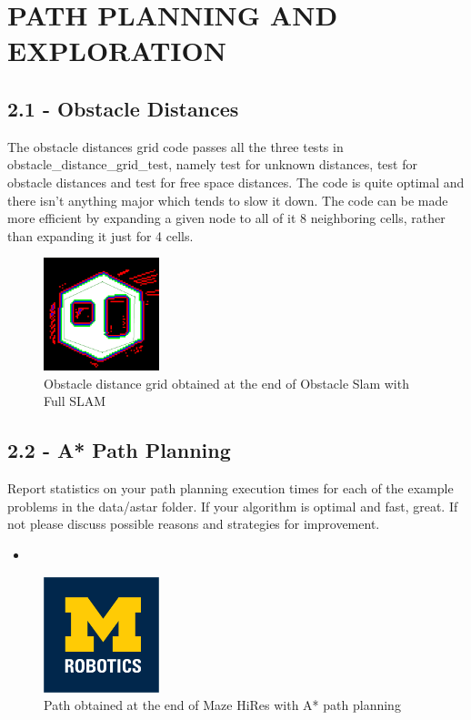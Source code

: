 \documentclass[journal,twocolumn]{IEEEtran}
\begin{document}
\section{PATH PLANNING AND EXPLORATION}

\subsection*{2.1 - Obstacle Distances} 

The obstacle distances grid code passes all the three tests in obstacle\_distance\_grid\_test, namely test for unknown distances, test for obstacle distances and test for free space distances. The code is quite optimal and there isn't anything major which tends to slow it down. The code can be made more efficient by expanding a given node to all of it 8 neighboring cells, rather than expanding it just for 4 cells.

\begin{figure}[H]
\centering
\includegraphics[width=0.3\textwidth]{Media/21.png}
\caption{Obstacle distance grid obtained at the end of Obstacle Slam with Full SLAM}
\end{figure}


\subsection*{2.2 - A* Path Planning} 

Report statistics on your path planning execution times for each of the example problems in the data/astar folder. If your algorithm is optimal and fast, great. If not please discuss possible reasons and strategies for improvement.

\begin{itemize}
\item

\end{itemize}

\begin{figure}[H]
\centering
\includegraphics[width=0.3\textwidth]{Media/template-robotics.jpg}
\caption{Path obtained at the end of Maze HiRes with A* path planning}
\end{figure}
\end{document}
